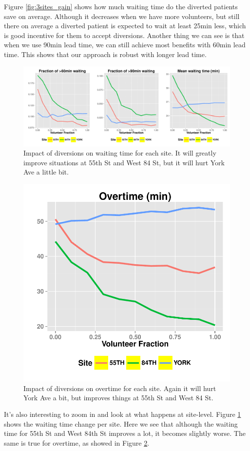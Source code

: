 Figure \ref{fig:3sites_gain} shows how much waiting
time do the diverted patients save on average. Although it decreases
when we have more volunteers, but still there on average a diverted
patient is expected to wait at least 25min less, which is good incentive
for them to accept diversions. Another thing we can see is that
when we use 90min lead time, we can still achieve most benefits with
60min lead time. This shows that our approach is robust with longer
lead time.

\begin{figure}[htp]
\centering
\includegraphics[width=.9\textwidth]{chap3/numeric/pic/3sites_site_wait}
\caption{Impact of diversions on waiting time for each site. It will
greatly improve situations at 55th St and West 84 St, but it will hurt
York Ave a little bit.}
\label{fig:3sites_site_wait}
\end{figure}

\begin{figure}[htp]
\centering
\includegraphics[width=.6\textwidth]{chap3/numeric/pic/3sites_site_overtime}
\caption{Impact of diversions on overtime for each site. Again it will hurt
York Ave a bit, but improves things at 55th St and West 84 St.}
\label{fig:3sites_site_overtime}
\end{figure}

It's also interesting to zoom in and look at what happens at site-level.
Figure \ref{fig:3sites_site_wait} shows the waiting time change per site. Here we see that
although the waiting time for 55th St and West 84th St improves a lot,
it becomes slightly worse. The same is true for overtime, as showed in
Figure \ref{fig:3sites_site_overtime}.

